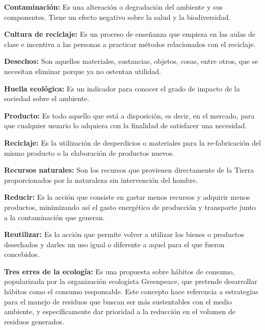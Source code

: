 \textbf{Contaminación:} Es una alteración o degradación del ambiente y sus componentes. Tiene un efecto negativo sobre la salud y la biodiversidad.

\textbf{Cultura de reciclaje:} Es un proceso de enseñanza que empieza en las aulas de clase e incentiva a las personas a practicar métodos relacionados con el reciclaje.

\textbf{Desechos:} Son aquellos materiales, sustancias, objetos, cosas, entre otros, que se necesitan eliminar porque ya no ostentan utilidad.

\textbf{Huella ecológica:} Es un indicador para conocer el grado de impacto de la sociedad sobre el ambiente.

\textbf{Producto:} Es todo aquello que está a disposición, es decir, en el mercado, para que cualquier usuario lo adquiera con la finalidad de satisfacer una necesidad.

\textbf{Reciclaje:} Es la utilización de desperdicios o materiales para la re-fabricación del mismo producto o la elaboración de productos nuevos.

\textbf{Recursos naturales:} Son los recursos que provienen directamente de la Tierra proporcionados por la naturaleza sin intervención del hombre.

\textbf{Reducir:} Es la acción que consiste en gastar menos recursos y adquirir menos productos, minimizando así el gasto energético de producción y transporte junto a la contaminación que generan.

\textbf{Reutilizar:} Es la acción que permite volver a utilizar los bienes o productos desechados y darles un uso igual o diferente a aquel para el que fueron concebidos.

\textbf{Tres erres de la ecología:} Es una propuesta sobre hábitos de consumo, popularizada por la organización ecologista Greenpeace, que pretende desarrollar hábitos como el consumo responsable. Este concepto hace referencia a estrategias para el manejo de residuos que buscan ser más sustentables con el medio ambiente, y específicamente dar prioridad a la reducción en el volumen de residuos generados.

\newpage
